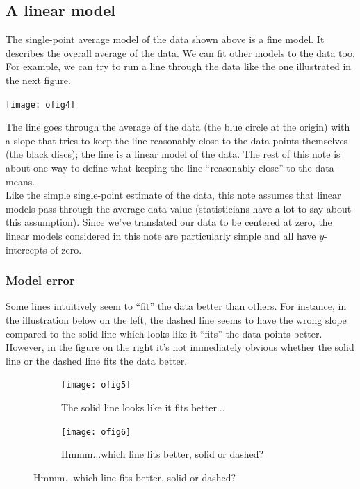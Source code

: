 \documentclass[10pt]{article}
\begin{document}
\subsection*{A linear model}

The single-point average model of the data shown above is a fine
model. It describes the overall average of the data. We can fit other
models to the data too. For example, we can try to run a line through the
data like the one illustrated in the next figure.

\begin{minipage}[c]{0.4\textwidth}
\begin{center}
\texttt{[image: ofig4]}
\end{center}
\end{minipage}
\begin{minipage}[t]{0.6\textwidth}
\vspace{-90pt}
The line  goes through the average of the data (the blue circle at the
origin) with a slope that tries to keep the line reasonably close to the data
points themselves (the black discs); the line is a linear model of the data.
The rest of this note is about one way to define what keeping the line
``reasonably close'' to the data means.\\[10pt]

Like the simple single-point estimate of the data, this note assumes that
linear models pass through the average data value (statisticians have a lot to
say about this assumption).  Since we've translated our data to be centered at
zero, the linear models considered in this note are particularly simple and all
have $y$-intercepts of zero. 
\end{minipage}

\subsubsection*{Model error}

Some lines intuitively seem to ``fit'' the data better than others.  For
instance, in the illustration below on the left, the dashed line seems to have
the wrong slope compared to the solid line which looks like it ``fits'' the
data points better.  However, in the figure on the right it's not immediately
obvious whether the solid line or the dashed line fits the data better.

\begin{figure}[h!]
\centering
\begin{subfigure}{0.4\textwidth}
\texttt{[image: ofig5]}
\caption*{The solid line looks like it fits better...}
\end{subfigure}
\hspace{0.1\textwidth}
\begin{subfigure}{0.4\textwidth}
\texttt{[image: ofig6]}
\caption*{Hmmm...which line fits better, solid or dashed?}
\end{subfigure}
\end{figure}
\end{document}
